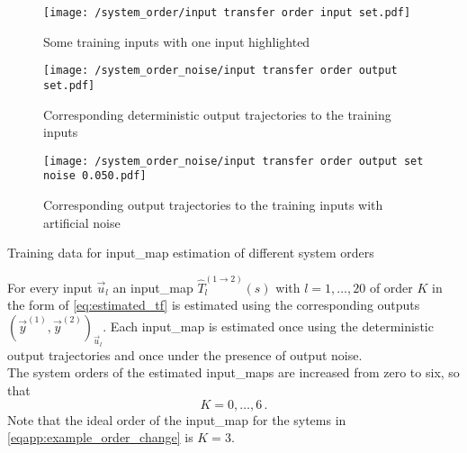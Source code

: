 \begin{example}
\begin{minipage}{1\textwidth}
\begingroup
	\centering
	\vspace{1em}
    \begin{subfigure}[t]{0.515\textwidth}
        \centering\captionsetup{width=.9\linewidth}
        \texttt{[image: /system\_order/input transfer order input set.pdf]}
        \caption{Some training inputs with one input highlighted}
        \label{subfigapp:input_tf_order_training_data_in}
    \end{subfigure}
    \hfill
    \begin{subfigure}[t]{0.495\textwidth}
        \centering\captionsetup{width=.9\linewidth}
        \texttt{[image: /system\_order\_noise/input transfer order output set.pdf]}
        \caption{Corresponding deterministic output trajectories to the training inputs}
        \label{subfigapp:input_tf_order_training_data_out}
    \end{subfigure}
    \hfill
    \begin{subfigure}[t]{0.495\textwidth}
        \centering\captionsetup{width=.9\linewidth}
        \texttt{[image: /system\_order\_noise/input transfer order output set noise 0.050.pdf]}
        \caption{Corresponding output trajectories to the training inputs with artificial noise}
        \label{subfigapp:input_tf_order_training_data_out2}
    \end{subfigure}
    \caption[System Order of Transfer Maps Example (Training Data)]{Training data for \gls*{input_map} estimation of different system orders}
    \label{figapp:input_tf_order_training_data}
\endgroup
\end{minipage}
 


For every input $\vec{u}_l$ an \gls*{input_map} $\hat{T}^{(1 \rightarrow 2)}_l(s)$ with $l = 1,\ldots, 20$ of order $K$ in the form of \eqref{eq:estimated_tf} is estimated using the corresponding outputs $\left(\vec{y}^{(1)}, \vec{y}^{(2)}\right)_{\vec{u}_l}$. Each \gls*{input_map} is estimated once using the deterministic output trajectories and once under the presence of output noise.\\ 
The system orders of the estimated \glspl*{input_map} are increased from zero to six, so that
\begin{equation}
	K = 0,\ldots,6\,.
\end{equation}
Note that the ideal order of the \gls*{input_map} for the sytems in \eqref{eqapp:example_order_change} is $K=3$.\\


\end{example}
